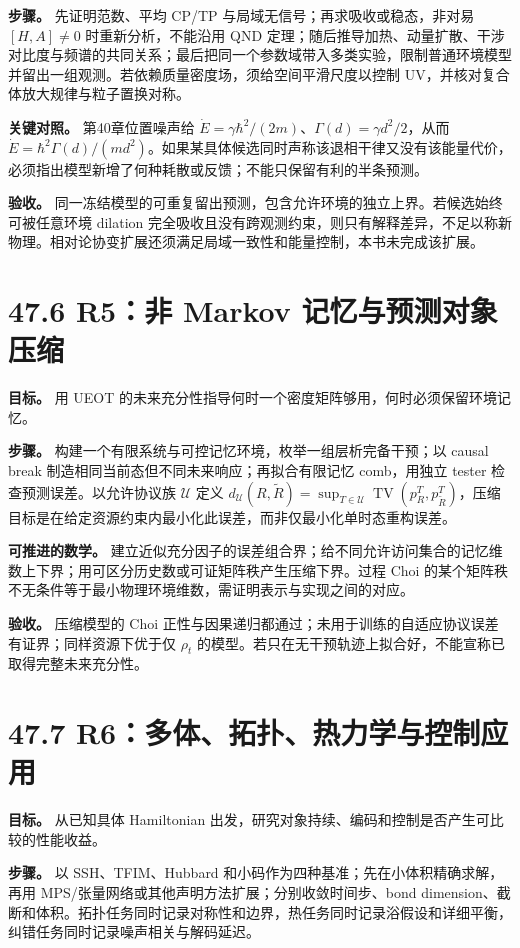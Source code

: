 \documentclass[
  11pt,
  oneside]{book}
\begin{document}
\textbf{步骤。} 先证明范数、平均 CP/TP
与局域无信号；再求吸收或稳态，非对易 \([H,A]\ne0\) 时重新分析，不能沿用
QND
定理；随后推导加热、动量扩散、干涉对比度与频谱的共同关系；最后把同一个参数域带入多类实验，限制普通环境模型并留出一组观测。若依赖质量密度场，须给空间平滑尺度以控制
UV，并核对复合体放大规律与粒子置换对称。

\textbf{关键对照。} 第40章位置噪声给
\(\dot E=\gamma\hbar^2/(2m)\)、\(\Gamma(d)=\gamma d^2/2\)，从而
\(\dot E=\hbar^2\Gamma(d)/(md^2)\)。如果某具体候选同时声称该退相干律又没有该能量代价，必须指出模型新增了何种耗散或反馈；不能只保留有利的半条预测。

\textbf{验收。}
同一冻结模型的可重复留出预测，包含允许环境的独立上界。若候选始终可被任意环境
dilation
完全吸收且没有跨观测约束，则只有解释差异，不足以称新物理。相对论协变扩展还须满足局域一致性和能量控制，本书未完成该扩展。

\section{47.6 R5：非 Markov 记忆与预测对象压缩}

\textbf{目标。} 用 UEOT
的未来充分性指导何时一个密度矩阵够用，何时必须保留环境记忆。

\textbf{步骤。} 构建一个有限系统与可控记忆环境，枚举一组层析完备干预；以
causal break 制造相同当前态但不同未来响应；再拟合有限记忆 comb，用独立
tester 检查预测误差。以允许协议族 \(\mathcal U\) 定义
\(d_{\mathcal U}(R,\widetilde R)=\sup_{T\in\mathcal U}\operatorname{TV}(p_R^T,p_{\widetilde R}^T)\)，压缩目标是在给定资源约束内最小化此误差，而非仅最小化单时态重构误差。

\textbf{可推进的数学。}
建立近似充分因子的误差组合界；给不同允许访问集合的记忆维数上下界；用可区分历史数或可证矩阵秩产生压缩下界。过程
Choi
的某个矩阵秩不无条件等于最小物理环境维数，需证明表示与实现之间的对应。

\textbf{验收。} 压缩模型的 Choi
正性与因果递归都通过；未用于训练的自适应协议误差有证界；同样资源下优于仅
\(\rho_t\)
的模型。若只在无干预轨迹上拟合好，不能宣称已取得完整未来充分性。

\section{47.7 R6：多体、拓扑、热力学与控制应用}

\textbf{目标。} 从已知具体 Hamiltonian
出发，研究对象持续、编码和控制是否产生可比较的性能收益。

\textbf{步骤。} 以 SSH、TFIM、Hubbard
和小码作为四种基准；先在小体积精确求解，再用
MPS/张量网络或其他声明方法扩展；分别收敛时间步、bond
dimension、截断和体积。拓扑任务同时记录对称性和边界，热任务同时记录浴假设和详细平衡，纠错任务同时记录噪声相关与解码延迟。
\end{document}
